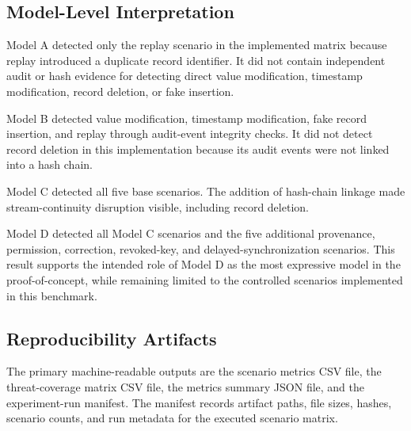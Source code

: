 \subsection{Model-Level Interpretation}

Model A detected only the replay scenario in the implemented matrix because replay introduced a duplicate record identifier. It did not contain independent audit or hash evidence for detecting direct value modification, timestamp modification, record deletion, or fake insertion.

Model B detected value modification, timestamp modification, fake record insertion, and replay through audit-event integrity checks. It did not detect record deletion in this implementation because its audit events were not linked into a hash chain.

Model C detected all five base scenarios. The addition of hash-chain linkage made stream-continuity disruption visible, including record deletion.

Model D detected all Model C scenarios and the five additional provenance, permission, correction, revoked-key, and delayed-synchronization scenarios. This result supports the intended role of Model D as the most expressive model in the proof-of-concept, while remaining limited to the controlled scenarios implemented in this benchmark.

\subsection{Reproducibility Artifacts}

The primary machine-readable outputs are the scenario metrics CSV file, the threat-coverage matrix CSV file, the metrics summary JSON file, and the experiment-run manifest. The manifest records artifact paths, file sizes, hashes, scenario counts, and run metadata for the executed scenario matrix.
